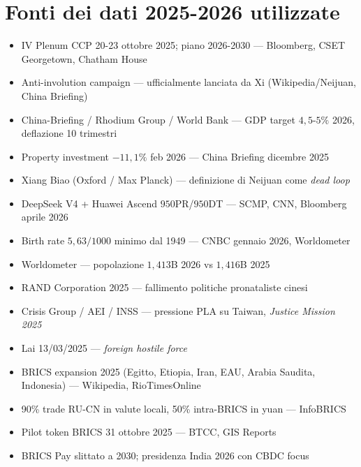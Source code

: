 \section{Fonti dei dati 2025-2026
utilizzate}\label{fonti-dei-dati-2025-2026-utilizzate}

\begin{itemize}
\tightlist
\item
  IV Plenum CCP 20-23 ottobre 2025; piano 2026-2030 --- Bloomberg, CSET
  Georgetown, Chatham House
\item
  Anti-involution campaign --- ufficialmente lanciata da Xi
  (Wikipedia/Neijuan, China Briefing)
\item
  China-Briefing / Rhodium Group / World Bank --- GDP target
  \(4{,}5\)-\(5\%\) 2026, deflazione 10 trimestri
\item
  Property investment \(-11{,}1\%\) feb 2026 --- China Briefing dicembre
  2025
\item
  Xiang Biao (Oxford / Max Planck) --- definizione di Neijuan come
  \emph{dead loop}
\item
  DeepSeek V4 + Huawei Ascend \(950\)PR/\(950\)DT --- SCMP, CNN,
  Bloomberg aprile 2026
\item
  Birth rate \(5{,}63/1000\) minimo dal 1949 --- CNBC gennaio 2026,
  Worldometer
\item
  Worldometer --- popolazione \(1{,}413\)B 2026 vs \(1{,}416\)B 2025
\item
  RAND Corporation 2025 --- fallimento politiche pronataliste cinesi
\item
  Crisis Group / AEI / INSS --- pressione PLA su Taiwan, \emph{Justice
  Mission 2025}
\item
  Lai 13/03/2025 --- \emph{foreign hostile force}
\item
  BRICS expansion 2025 (Egitto, Etiopia, Iran, EAU, Arabia Saudita,
  Indonesia) --- Wikipedia, RioTimesOnline
\item
  90\% trade RU-CN in valute locali, 50\% intra-BRICS in yuan ---
  InfoBRICS
\item
  Pilot token BRICS 31 ottobre 2025 --- BTCC, GIS Reports
\item
  BRICS Pay slittato a 2030; presidenza India 2026 con CBDC focus
\end{itemize}


